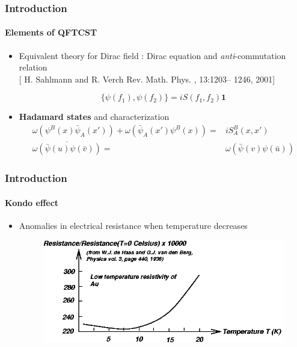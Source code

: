 \documentclass[french]{beamer}
\begin{document}
\begin{frame}
\frametitle{Introduction}
\framesubtitle{Elements of QFTCST}

\begin{itemize}

\item Equivalent theory for Dirac field : Dirac equation and \textit{anti}-commutation relation
\\
\color{blue}[ H. Sahlmann and R. Verch
Rev. Math. Phys.
, 13:1203–
1246, 2001]\color{black}

\begin{equation*}
\{\psi(f_1), \psi(f_2)\} = i S(f_1, f_2) \mathbf{1}
\end{equation*}


\item \textbf{Hadamard states} and characterization
 \begin{equation*}
\begin{split}
\omega(\psi^B(x)\bar{\psi}_A(x')) + \omega(\bar{\psi}_A(x')\psi^B(x)) = &
iS^B_A(x,x') \\
\overline{\omega(\bar{\psi}(u)\psi(\bar{v}))} = & \omega(\bar{\psi}(v)\psi(\bar{u}))
\end{split}
\end{equation*}

\end{itemize}

\end{frame}
\begin{frame}
\frametitle{Introduction}
\framesubtitle{Kondo effect}
\begin{itemize}
\item Anomalies in electrical resistance when temperature decreases

\begin{figure}[!h]
  \centering
  \includegraphics[height=0.4\textheight]{kondo}
\end{figure}

\end{itemize}

\end{frame}
\end{document}
